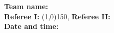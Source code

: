 \begin{flushleft}
\textbf{Team name:} \hrulefill \\ 
\vspace{0.4cm}
\textbf{Referee I:} \line(1,0){150}, \textbf{Referee II:} \hrulefill \\
\vspace{0.4cm}
\textbf{Date and time:} \hrulefill
\vspace{0.1cm}
\end{flushleft}
